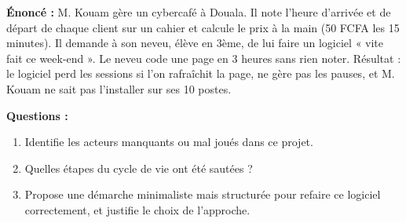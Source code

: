 \documentclass[11pt]{article}
\begin{document}
\begin{exoresolu}
\textbf{Énoncé :} M. Kouam gère un cybercafé à Douala. Il note l'heure d'arrivée et de départ de chaque client sur un cahier et calcule le prix à la main (50 FCFA les 15 minutes). Il demande à son neveu, élève en 3ème, de lui faire un logiciel « vite fait ce week-end ». Le neveu code une page en 3 heures sans rien noter. Résultat : le logiciel perd les sessions si l'on rafraîchit la page, ne gère pas les pauses, et M. Kouam ne sait pas l'installer sur ses 10 postes.

\textbf{Questions :}
\begin{enumerate}
    \item Identifie les acteurs manquants ou mal joués dans ce projet.
    \item Quelles étapes du cycle de vie ont été sautées ?
    \item Propose une démarche minimaliste mais structurée pour refaire ce logiciel correctement, et justifie le choix de l'approche.
\end{enumerate}


\end{exoresolu}
\end{document}
